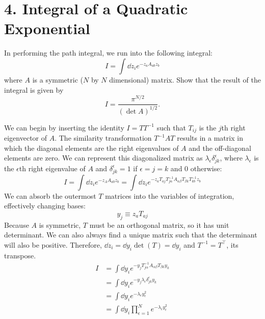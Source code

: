 \documentclass[a4paper,twoside]{article}
\begin{document}
\section*{4. Integral of a Quadratic Exponential}
In performing the path integral, we run into the following integral:
\begin{equation}
    I = \int \dd{z_i} e^{-z_a A_{ab} z_b}
\end{equation}
where $ A $ is a symmetric ($ N $ by $ N $ dimensional) matrix. Show that the result of the integral is given by
\begin{equation}
    I = \frac{\pi^{N/2}}{(\det{A})^{1/2}}.
\end{equation}
\begin{problem}
    We can begin by inserting the identity $ I = TT^{-1} $ such that $ T_{ij} $ is the $ j $th right eigenvector of $ A $. The similarity transformation $ T^{-1} A T $ results in a matrix in which the diagonal elements are the right eigenvalues of $ A $ and the off-diagonal elements are zero. We can represent this diagonalized matrix as $ \lambda_{\epsilon} \delta^{\epsilon}_{jk} $, where $ \lambda_{\epsilon} $ is the $ \epsilon $th right eigenvalue of $ A $ and $ \delta^{\epsilon}_{jk} = 1 $ if $ \epsilon = j = k $ and $ 0 $ otherwise:
    \begin{equation}
        I = \int \dd{z_i} e^{-z_A A_{ab} z_b} = \int \dd{z_i} e^{- z_a T_{aj} T_{j \alpha}^{-1} A_{\alpha \beta} T_{\beta k} T_{kb}^{-1} z_b}
    \end{equation}
    We can absorb the outermost $ T $ matrices into the variables of integration, effectively changing bases:
    \begin{equation}
        y_j \equiv z_a T_{aj}
    \end{equation}
    Because $ A $ is symmetric, $ T $ must be an orthogonal matrix, so it has unit determinant. We can also always find a unique matrix such that the determinant will also be positive. Therefore, $ \dd{z_i} = \dd{y_i} \det(T) = \dd{y_i} $ and $ T^{-1} = T^\top $, its transpose.
    \begin{align}
        I &= \int \dd{y_i} e^{- y_j T_{j \alpha}^{-1} A_{\alpha \beta} T_{\beta k} y_k} \\
        &= \int \dd{y_i} e^{- y_j \lambda_{\epsilon} \delta^{\epsilon}_{jk} y_k} \\
        &= \int \dd{y_i} e^{- \lambda_{\epsilon} y_{\epsilon}^2} \\
        &= \int \dd{y_i} \prod_{\epsilon=1}^{N} e^{- \lambda_{\epsilon} y_{\epsilon}^2} \\

\end{align}
\end{problem}
\end{document}

